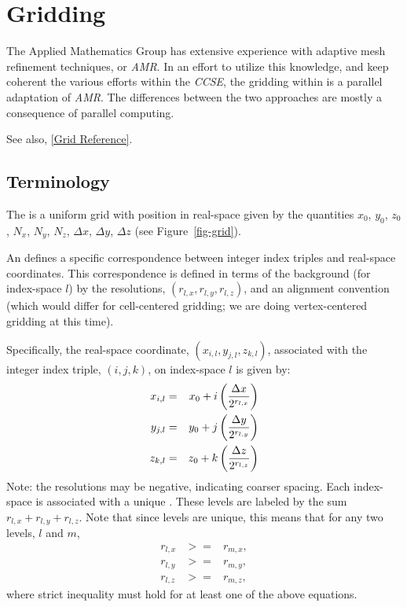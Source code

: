 
\chapter{Gridding}
\label{Gridding}

The Applied Mathematics Group has extensive experience with adaptive
mesh refinement techniques, or {\em AMR}.
In an effort to utilize this knowledge, and keep coherent the various
efforts within the {\em CCSE}, the gridding within \parflow{} is
a parallel adaptation of {\em AMR}.
The differences between the two approaches are mostly a consequence
of parallel computing.

See also, \ref{Grid Reference}.


\section{Terminology}
\label{Terminology}

The  is a uniform grid with position in
real-space given by the quantities
$x_0$, $y_0$, $z_0$, $N_x$, $N_y$, $N_z$, $\Delta x$, $\Delta y$, $\Delta z$
(see Figure~\ref{fig-grid}).

An  defines a specific correspondence between
integer index triples and real-space coordinates.
This correspondence is defined in terms of the background
(for index-space $l$)
by the resolutions, $(r_{l,x}, r_{l,y}, r_{l,z})$,
and an alignment convention (which would differ for cell-centered
gridding; we are doing vertex-centered gridding at this time).

Specifically, the real-space coordinate, $(x_{i,l}, y_{j,l}, z_{k,l})$,
associated with the integer index triple, $(i, j, k)$,
on index-space $l$ is given by:
\begin{eqnarray}
x_{i,l} & = & x_0 + i \left( {{\Delta x} \over {2^{r_{l,x}}}} \right) \\
y_{j,l} & = & y_0 + j \left( {{\Delta y} \over {2^{r_{l,y}}}} \right) \\
z_{k,l} & = & z_0 + k \left( {{\Delta z} \over {2^{r_{l,z}}}} \right)
\end{eqnarray}
Note: the resolutions may be negative, indicating coarser spacing.
Each index-space is associated with a unique .
These levels are labeled by the sum $r_{l,x} + r_{l,y} + r_{l,z}$.
Note that since levels are unique, this means that for any two
levels, $l$ and $m$,
\begin{eqnarray}
r_{l,x} & >= & r_{m,x}, \\
r_{l,y} & >= & r_{m,y}, \\
r_{l,z} & >= & r_{m,z},
\end{eqnarray}
where strict inequality must hold for at least one of the above
equations.

